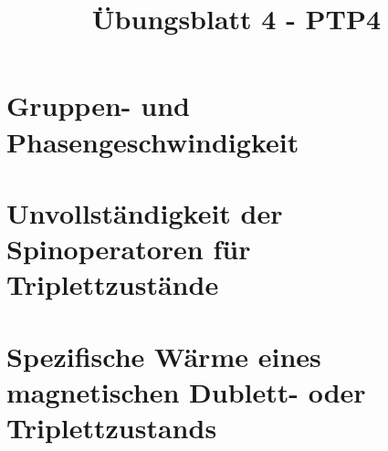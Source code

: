 \documentclass[a4paper,11pt]{article}
\title{Übungsblatt 4 - PTP4}
\author{}
\date{}
\begin{document}
\maketitle

\section{Gruppen- und Phasengeschwindigkeit}

\subsection{}

\subsection{}

\subsection{}

\section{Unvollständigkeit der Spinoperatoren für Triplettzustände}

\subsection{}

\subsection{}

\section{Spezifische Wärme eines magnetischen Dublett- oder Triplettzustands}

\subsection{}

\subsection{}

\subsection{}
\end{document}
